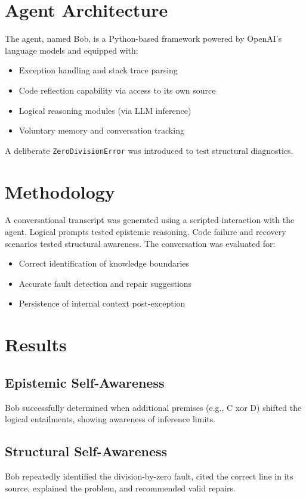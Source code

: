 \documentclass[11pt]{article}
\begin{document}
\section{Agent Architecture}
The agent, named Bob, is a Python-based framework powered by OpenAI's language models and equipped with:
\begin{itemize}
    \item Exception handling and stack trace parsing
    \item Code reflection capability via access to its own source
    \item Logical reasoning modules (via LLM inference)
    \item Voluntary memory and conversation tracking
\end{itemize}
A deliberate \texttt{ZeroDivisionError} was introduced to test structural diagnostics.

\section{Methodology}
A conversational transcript was generated using a scripted interaction with the agent. Logical prompts tested epistemic reasoning. Code failure and recovery scenarios tested structural awareness. The conversation was evaluated for:
\begin{itemize}
    \item Correct identification of knowledge boundaries
    \item Accurate fault detection and repair suggestions
    \item Persistence of internal context post-exception
\end{itemize}

\section{Results}
\subsection{Epistemic Self-Awareness}
Bob successfully determined when additional premises (e.g., C xor D) shifted the logical entailments, showing awareness of inference limits.

\subsection{Structural Self-Awareness}
Bob repeatedly identified the division-by-zero fault, cited the correct line in its source, explained the problem, and recommended valid repairs.
\end{document}
